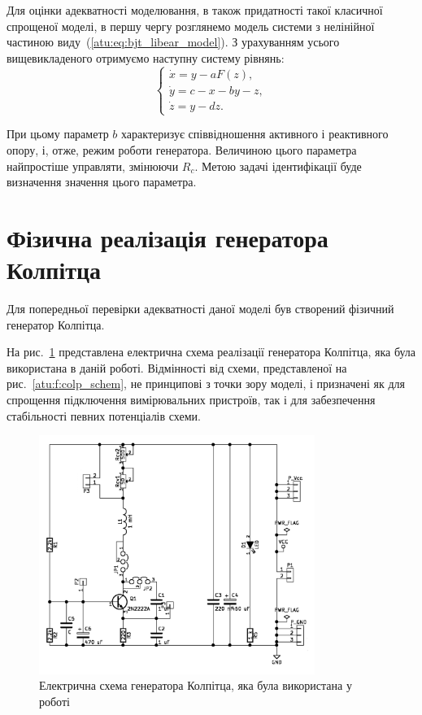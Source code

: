Для оцінки адекватності моделювання, в також придатності
такої класичної спрощеної моделі, в першу чергу розглянемо
модель системи з нелінійної частиною виду~(\ref{atu:eq:bjt_libear_model}). З
урахуванням усього вищевикладеного отримуємо наступну систему
рівнянь:
%
\begin{equation}
\label{atu:eq:colp}
\begin{cases}
  \dot{x} = y - a F(z), \\
  \dot{y} = c - x - by - z, \\
  \dot{z} = y - d z.
\end{cases}
\end{equation}

При цьому параметр
$b $ характеризує співвідношення активного і реактивного опору,
і, отже, режим роботи генератора. Величиною цього параметра
найпростіше управляти, змінюючи
$R_c $. Метою задачі ідентифікації буде визначення значення
цього параметра.




\section{Фізична реалізація генератора Колпітца} %

Для попередньої перевірки адекватності даної моделі був
створений фізичний генератор Колпітца.

На рис.~\ref{atu:f:colp_schem_real} представлена електрична схема
реалізації генератора Колпітца, яка була використана в даній
роботі. Відмінності від схеми, представленої на рис.~\ref{atu:f:colp_schem},
не принципові з точки зору моделі, і призначені як для спрощення
підключення вимірювальних пристроїв, так і для забезпечення
стабільності певних потенціалів схеми.

\begin{figure}[htb!]
\centerline{\includegraphics[width=0.8\textwidth]{p/colp_schem_real.png} }
\caption{Електрична схема генератора Колпітца, яка була використана у роботі}
\label{atu:f:colp_schem_real}
\end{figure}

